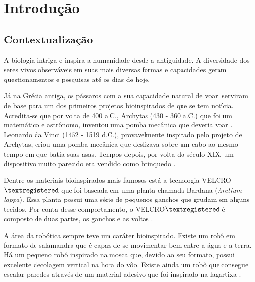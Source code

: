 \documentclass[
	12pt,				%
	openright,			%
	oneside,			%
	a4paper,			%
	english,			%
	brazil				%
	]{abntex2}
\begin{document}
\chapter{Introdução} %
		
		\section{Contextualização}


		A biologia intriga e inspira a humanidade desde a antiguidade. A diversidade dos seres vivos observáveis em suas mais diversas formas e capacidades geram questionamentos e pesquisas até os dias de hoje. 

		Já na Grécia antiga, os pássaros com a sua capacidade natural de voar, serviram de base para um dos primeiros projetos bioinspirados de que se tem notícia. Acredita-se que por volta de 400 a.C., Archytas (430 - 360 a.C.) que foi um matemático e astrônomo, inventou uma pomba mecânica que deveria voar \cite{livingstone2014greece}. Leonardo da Vinci (1452 - 1519 d.C.), provavelmente inspirado pelo projeto de Archytas, criou uma pomba mecânica que deslizava sobre um cabo ao mesmo tempo em que batia suas asas. Tempos depois, por volta do século XIX, um dispositivo muito parecido era vendido como brinquedo \cite{rosheim2006leonardo}.

		Dentre os materiais bioinspirados mais famosos está a tecnologia VELCRO${\textregistered}$ que foi baseada em uma planta chamada Bardana (\textit{Arctium lappa}). Essa planta possui uma série de pequenos ganchos que grudam em alguns tecidos. Por conta desse comportamento, o VELCRO${\textregistered}$ é composto de duas partes, os ganchos e as voltas \cite{velcro2019about}. 
		
		A área da robótica sempre teve um caráter bioinspirado. Existe um robô em formato de salamandra que é capaz de se movimentar bem entre a água e a terra. Há um pequeno robô inspirado na mosca que, devido ao seu formato, possui excelente decolagem vertical na hora do vôo. Existe ainda um robô que consegue escalar paredes através de um material adesivo que foi inspirado na lagartixa \cite{pfeifer2007biorobot}. 
\end{document}
